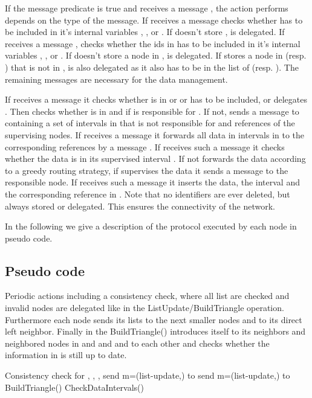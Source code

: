 \documentclass[11pt]{article}
\begin{document}
If the message predicate is true and  receives a message , the
action  performs depends on the type of the message. If  receives a
message   checks whether  has to be included in
it's internal variables , ,  or . If  doesn't
store ,  is delegated. If  receives a message
,  checks whether the ids in  has to be
included in it's internal variables , ,  or . If  doesn't store a node  in ,  is delegated. If  stores a node
 in  (resp. ) that is not in ,  is also delegated as
it also has to be in the list of  (resp. ). The remaining
messages are necessary for the data management.

If  receives a message  it checks whether 
is in  or  or has to be included, or delegates . Then 
checks whether  is in  and if  is responsible for . If
not,  sends a message  to  containing
a set of intervals in  that  is not responsible for and references
of the supervising nodes.
If  receives a message
 it forwards all data in intervals in
 to the corresponding references by a message
. If  receives such a message it checks whether
the data is in its supervised interval . If not  forwards the data
according to a greedy routing strategy, if  supervises the data it sends
a message  to the responsible node. If  receives
such a message it inserts the data, the interval and the corresponding
reference in . Note that no identifiers are ever deleted, but always
stored or delegated. This ensures the connectivity of the network.

In the following we give a description of the protocol executed by each node
in pseudo code.

\subsection{Pseudo code}



\begin{algorithm}[H]
Periodic actions including a consistency check, where all list  are checked and invalid nodes are delegated like in the ListUpdate/BuildTriangle operation. Furthermore each node sends its lists  to the  next smaller nodes and  to its direct left neighbor. Finally in the BuildTriangle()  introduces itself to its neighbors and neighbored nodes in  and  and  and  to each other and checks whether the information in  is still up to date.

\begin{algorithmic}
\State  {}
\State Consistency check for , , , 
\ForAll{}
\State send m=(list-update,) to 
\EndFor
\ForAll{}
\State send m=(list-update,) to 
\EndFor
\State BuildTriangle()
\State CheckDataIntervals()
\end{algorithmic}
\end{algorithm}
\end{document}
